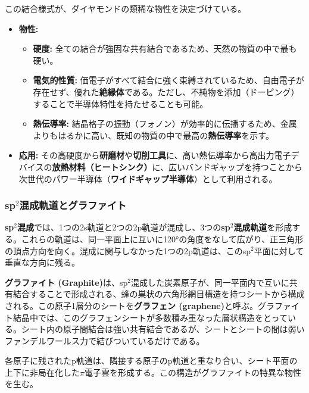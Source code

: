 \documentclass[11pt,a4paper]{ltjsarticle}
\begin{document}
この結合様式が、ダイヤモンドの類稀な物性を決定づけている。

\begin{itemize}
\item \textbf{物性:}
\begin{itemize}
\item \textbf{硬度:} 全ての結合が強固な共有結合であるため、天然の物質の中で最も硬い。
\item \textbf{電気的性質:} 価電子がすべて結合に強く束縛されているため、自由電子が存在せず、優れた\textbf{絶縁体}である。ただし、不純物を添加（ドーピング）することで半導体特性を持たせることも可能。
\item \textbf{熱伝導率:} 結晶格子の振動（フォノン）が効率的に伝播するため、金属よりもはるかに高い、既知の物質の中で最高の\textbf{熱伝導率}を示す。
\end{itemize}
\item \textbf{応用:} その高硬度から\textbf{研磨材}や\textbf{切削工具}に、高い熱伝導率から高出力電子デバイスの\textbf{放熱材料（ヒートシンク）}に、広いバンドギャップを持つことから次世代のパワー半導体（\textbf{ワイドギャップ半導体}）として利用される。
\end{itemize}

\subsubsection*{sp$^2$混成軌道とグラファイト}

\textbf{sp$^2$混成}では、1つの2s軌道と2つの2p軌道が混成し、3つの\textbf{sp$^2$混成軌道}を形成する。これらの軌道は、同一平面上に互いに120°の角度をなして広がり、正三角形の頂点方向を向く。混成に関与しなかった1つの2p軌道は、このsp$^2$平面に対して垂直な方向に残る。

\textbf{グラファイト (Graphite)}は、sp$^2$混成した炭素原子が、同一平面内で互いに共有結合することで形成される、蜂の巣状の六角形網目構造を持つシートから構成される。この原子1層分のシートを\textbf{グラフェン (graphene)}と呼ぶ。グラファイト結晶中では、このグラフェンシートが多数積み重なった層状構造をとっている。シート内の原子間結合は強い共有結合であるが、シートとシートの間は弱いファンデルワールス力で結びついているだけである。

各原子に残されたp軌道は、隣接する原子のp軌道と重なり合い、シート平面の上下に非局在化した$\pi$電子雲を形成する。この構造がグラファイトの特異な物性を生む。
\end{document}

